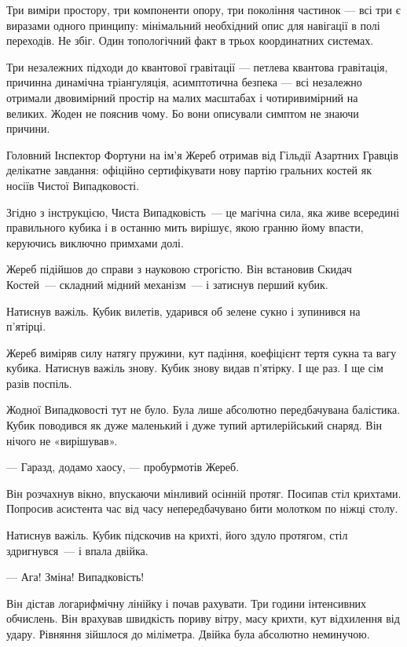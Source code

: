 \documentclass[12pt, a4paper, openany]{book}
\begin{document}
Три виміри простору, три компоненти опору, три покоління частинок --- всі три є виразами одного принципу: мінімальний необхідний опис для навігації в полі переходів. Не збіг. Один топологічний факт в трьох координатних системах.

Три незалежних підходи до квантової гравітації --- петлева квантова гравітація, причинна динамічна тріангуляція, асимптотична безпека --- всі незалежно отримали двовимірний простір на малих масштабах і чотиривимірний на великих. Жоден не пояснив чому. Бо вони описували симптом не знаючи причини.


\begin{terrybox}
Головний Інспектор Фортуни на ім'я Жереб отримав від Гільдії Азартних Гравців делікатне завдання: офіційно сертифікувати нову партію гральних костей як носіїв Чистої Випадковості.

Згідно з інструкцією, Чиста Випадковість~--- це магічна сила, яка живе всередині правильного кубика і в останню мить вирішує, якою гранню йому впасти, керуючись виключно примхами долі.

Жереб підійшов до справи з науковою строгістю. Він встановив Скидач Костей~--- складний мідний механізм~--- і затиснув перший кубик.

Натиснув важіль. Кубик вилетів, ударився об зелене сукно і зупинився на п'ятірці.

Жереб виміряв силу натягу пружини, кут падіння, коефіцієнт тертя сукна та вагу кубика. Натиснув важіль знову. Кубик знову видав п'ятірку. І ще раз. І ще сім разів поспіль.

Жодної Випадковості тут не було. Була лише абсолютно передбачувана балістика. Кубик поводився як дуже маленький і дуже тупий артилерійський снаряд. Він нічого не «вирішував».

--- Гаразд, додамо хаосу, --- пробурмотів Жереб.

Він розчахнув вікно, впускаючи мінливий осінній протяг. Посипав стіл крихтами. Попросив асистента час від часу непередбачувано бити молотком по ніжці столу.

Натиснув важіль. Кубик підскочив на крихті, його здуло протягом, стіл здригнувся~--- і впала двійка.

--- Ага! Зміна! Випадковість!

Він дістав логарифмічну лінійку і почав рахувати. Три години інтенсивних обчислень. Він врахував швидкість пориву вітру, масу крихти, кут відхилення від удару. Рівняння зійшлося до міліметра. Двійка була абсолютно неминучою.


\end{terrybox}
\end{document}
